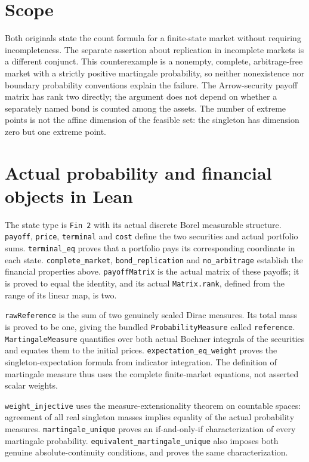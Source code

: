 \documentclass[11pt]{article}
\begin{document}
\newpage
\raggedright
\section*{Scope}
Both originals state the count formula for a finite-state market without
requiring incompleteness. The separate assertion about replication in
incomplete markets is a different conjunct. This counterexample is a
nonempty, complete, arbitrage-free market with a strictly positive
martingale probability, so neither nonexistence nor boundary probability
conventions explain the failure. The Arrow-security payoff matrix has
rank two directly; the argument does not depend on whether a separately
named bond is counted among the assets. The number of extreme points is
not the affine dimension of the feasible set: the singleton has dimension
zero but one extreme point.

\section*{Actual probability and financial objects in Lean}
The state type is \texttt{Fin 2} with its actual discrete Borel measurable
structure. \texttt{payoff}, \texttt{price}, \texttt{terminal} and
\texttt{cost} define the two securities and actual portfolio sums.
\texttt{terminal\_eq} proves that a portfolio pays its corresponding
coordinate in each state. \texttt{complete\_market},
\texttt{bond\_replication} and \texttt{no\_arbitrage} establish the
financial properties above. \texttt{payoffMatrix} is the actual matrix
of these payoffs; it is proved to equal the identity, and its actual
\texttt{Matrix.rank}, defined from the range of its linear map, is two.

\texttt{rawReference} is the sum of two genuinely scaled Dirac measures.
Its total mass is proved to be one, giving the bundled
\texttt{ProbabilityMeasure} called \texttt{reference}.
\texttt{MartingaleMeasure} quantifies over both actual Bochner integrals
of the securities and equates them to the initial prices.
\texttt{expectation\_eq\_weight} proves the singleton-expectation formula
from indicator integration. The definition of martingale measure thus
uses the complete finite-market equations, not asserted scalar weights.

\texttt{weight\_injective} uses the measure-extensionality theorem on
countable spaces: agreement of all real singleton masses implies equality
of the actual probability measures. \texttt{martingale\_unique} proves
an if-and-only-if characterization of every martingale probability.
\texttt{equivalent\_martingale\_unique} also imposes both genuine
absolute-continuity conditions, and proves the same characterization.
\end{document}
